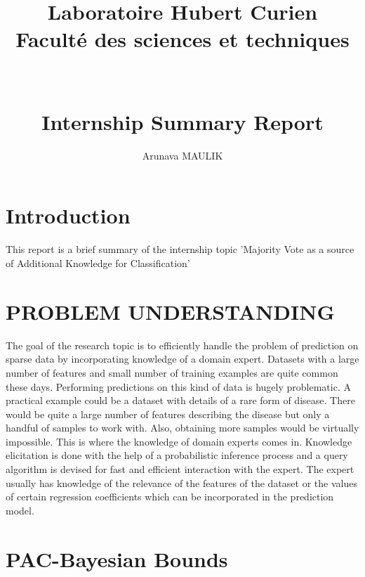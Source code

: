 \documentclass[11pt]{article}
\title{Laboratoire Hubert Curien\\ Faculté des sciences et techniques\\\phantom\\ \\ Internship Summary Report}
\author{Arunava MAULIK}
\begin{document}
 

\maketitle



\section{Introduction}\phantom

This report is a brief summary of the internship topic 'Majority Vote as a source of Additional Knowledge for Classification'

\section{PROBLEM UNDERSTANDING}\phantom 

The goal of the research topic is to efficiently handle the problem of prediction on sparse data by incorporating knowledge of a domain expert.
Datasets with a large number of features and small number of training examples are quite common these days. Performing predictions on this kind of data is hugely problematic. A practical example could be a dataset with details of a rare form of disease. There would be quite a large number of features describing the disease but only a handful of samples to work with. Also, obtaining more samples would be virtually impossible.
This is where the knowledge of domain experts comes in.
Knowledge elicitation is done with the help of a probabilistic inference process and a query algorithm is devised for fast and efficient interaction with the expert. The expert usually has knowledge of the relevance of the features of the dataset or the values of certain regression coefficients which can be incorporated in the prediction model.

\section{PAC-Bayesian Bounds }\phantom
\end{document}
